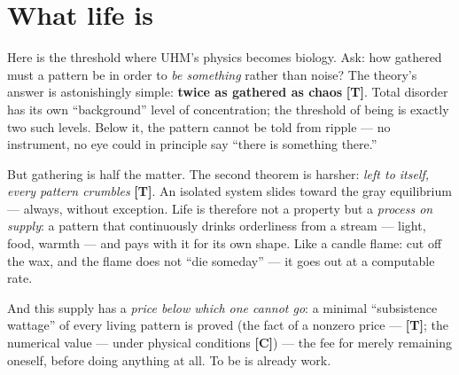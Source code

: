 \documentclass[11pt,letterpaper]{article}
\newcommand{\stT}{\textbf{[T]}\xspace}
\newcommand{\stC}{\textbf{[C]}\xspace}
\begin{document}
\section{What life is}
\label{sec:life}

Here is the threshold where UHM's physics becomes biology. Ask: how
gathered must a pattern be in order to \emph{be something} rather
than noise? The theory's answer is astonishingly simple:
\textbf{twice as gathered as chaos} \stT. Total disorder has its own
``background'' level of concentration; the threshold of being is
exactly two such levels. Below it, the pattern cannot be told from
ripple --- no instrument, no eye could in principle say ``there is
something there.''

But gathering is half the matter. The second theorem is harsher:
\emph{left to itself, every pattern crumbles} \stT. An isolated
system slides toward the gray equilibrium --- always, without
exception. Life is therefore not a property but a \emph{process on
supply}: a pattern that continuously drinks orderliness from a
stream --- light, food, warmth --- and pays with it for its own
shape. Like a candle flame: cut off the wax, and the flame does not
``die someday'' --- it goes out at a computable rate.

And this supply has a \emph{price below which one cannot go}: a
minimal ``subsistence wattage'' of every living pattern is proved (the
fact of a nonzero price --- \stT; the numerical value --- under
physical conditions \stC) --- the fee for merely remaining oneself, before doing
anything at all. To be is already work.
\end{document}
